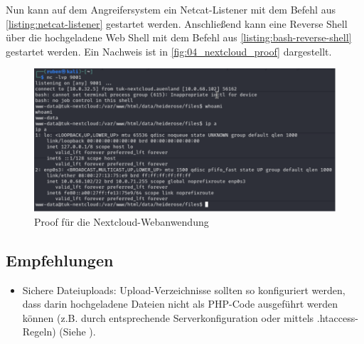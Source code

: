 Nun kann auf dem Angreifersystem ein Netcat-Listener mit dem Befehl aus \autoref{listing:netcat-listener} gestartet werden. Anschließend kann eine Reverse Shell über die hochgeladene Web Shell mit dem Befehl aus \autoref{listing:bash-reverse-shell} gestartet werden. Ein Nachweis ist in \autoref{fig:04_nextcloud_proof} dargestellt.

\begin{figure}[!ht]
    \centering
    \includegraphics[width=\linewidth]{images/proofs/04_nextcloud_proof.png}
    \caption{Proof für die Nextcloud-Webanwendung}
    \label{fig:04_nextcloud_proof}
\end{figure}

\subsection*{Empfehlungen}
\begin{itemize}
    \item Sichere Dateiuploads: Upload-Verzeichnisse sollten so konfiguriert werden, dass darin hochgeladene Dateien nicht als PHP-Code ausgeführt werden können (z.B. durch entsprechende Serverkonfiguration oder mittels .htaccess-Regeln) (Siehe \cite{owaspFileUpload}).
\end{itemize}

